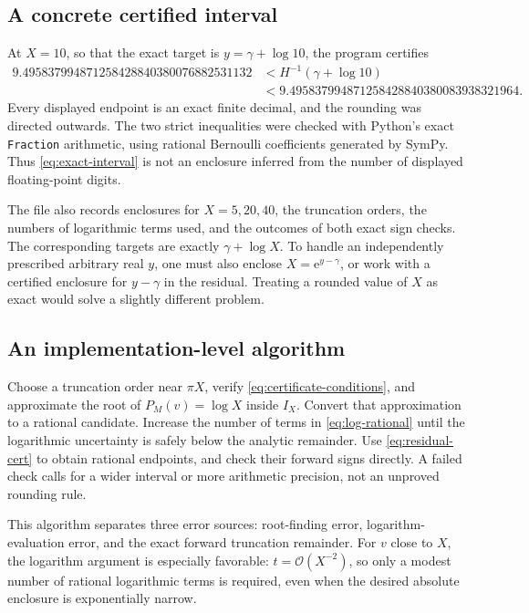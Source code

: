 \documentclass[11pt,a4paper]{article}
\theoremstyle{definition}
\numberwithin{equation}{section}
\newcommand{\ee}{\mathrm{e}}
\newcommand{\Oh}{\mathcal O}
\begin{document}
\subsection{A concrete certified interval}
At $X=10$, so that the exact target is $y=\gamma+\log10$, the program certifies
\begin{equation}
 \begin{split}
 9.495837994871258428840380076882531132
 &<H^{-1}(\gamma+\log10)\\
 &<9.495837994871258428840380083938321964.
 \end{split}
 \label{eq:exact-interval}
\end{equation}
Every displayed endpoint is an exact finite decimal, and the rounding was directed outwards. The two strict inequalities were checked with Python's exact \texttt{Fraction} arithmetic, using rational Bernoulli coefficients generated by SymPy. Thus \eqref{eq:exact-interval} is not an enclosure inferred from the number of displayed floating-point digits.

The file  also records enclosures for $X=5,20,40$, the truncation orders, the numbers of logarithmic terms used, and the outcomes of both exact sign checks. The corresponding targets are exactly $\gamma+\log X$. To handle an independently prescribed arbitrary real $y$, one must also enclose $X=\ee^{y-\gamma}$, or work with a certified enclosure for $y-\gamma$ in the residual. Treating a rounded value of $X$ as exact would solve a slightly different problem.

\subsection{An implementation-level algorithm}
Choose a truncation order near $\pi X$, verify \eqref{eq:certificate-conditions}, and approximate the root of $P_M(v)=\log X$ inside $I_X$. Convert that approximation to a rational candidate. Increase the number of terms in \eqref{eq:log-rational} until the logarithmic uncertainty is safely below the analytic remainder. Use \eqref{eq:residual-cert} to obtain rational endpoints, and check their forward signs directly. A failed check calls for a wider interval or more arithmetic precision, not an unproved rounding rule.

This algorithm separates three error sources: root-finding error, logarithm-evaluation error, and the exact forward truncation remainder. For $v$ close to $X$, the logarithm argument is especially favorable: $t=\Oh(X^{-2})$, so only a modest number of rational logarithmic terms is required, even when the desired absolute enclosure is exponentially narrow.
\end{document}

